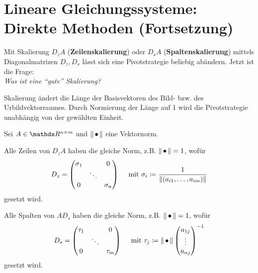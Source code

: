 % 
% 
% 
% 



\chapter{Lineare Gleichungssysteme: Direkte Methoden (Fortsetzung)}


Mit Skalierung $D_zA$ (\textbf{Zeilenskalierung}) oder
$D_sA$ (\textbf{Spaltenskalierung})
mittels Diagonalmatrizen $D_z, D_s$ lässt sich eine Pivotstrategie beliebig abändern.
Jetzt ist die Frage: \\
\textit{Was ist eine \enquote{gute} Skalierung?}

Skalierung ändert die Länge der Basisvektoren des Bild- bzw. des Urbildvektorraumes.
Durch Normierung der Länge auf 1 wird die Pivotstrategie unabhängig von der 
gewählten Einheit.

Sei $A\in\Renm $ und $\left\| \,\bullet\, \right\| $ eine Vektornorm.


 
Alle Zeilen von $D_zA$ haben die gleiche Norm, z.B. $\left\| \,\bullet\, \right\| =1$, wofür 
\begin{gather}
  D_z = \begin{pmatrix}
    \sigma_1 & & 0 \\
    &\ddots & \\ 
    0 && \sigma_n
  \end{pmatrix}
  \quad \text{ mit }\sigma_i\coloneqq \frac{1}{\nn[(a_{i1}, \dots , a_{im})]}
  \label{IV.1.1}
\end{gather}
gesetzt wird.


 
Alle Spalten von $AD_s$ haben die gleiche Norm, z.B. $\left\| \,\bullet\, \right\| =1$, wofür 
\begin{gather}
  D_s = \begin{pmatrix}
    \tau_1 & & 0 \\
    &\ddots & \\ 
    0 && \tau_m
  \end{pmatrix}
  \quad \text{ mit }\tau_j\coloneqq \nn{\begin{pmatrix}
      a_{1j} \\ \vdots \\ a_{nj}
    \end{pmatrix}}^{-1}
  \label{IV.1.2}
\end{gather}
gesetzt wird.

